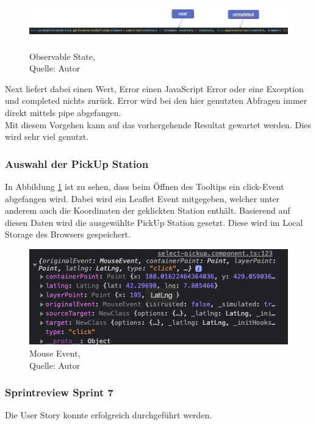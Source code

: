 \begin{figure}[H]
	\centering
	\includegraphics[width=1\textwidth]{images/observable.PNG}
	\caption[Observable States]{Observable State,\\ Quelle: Autor}
	\label{img: observableState}
\end{figure} 

Next liefert dabei einen Wert, Error einen JavaScript Error oder eine Exception und completed nichts zurück. 
Error wird bei den hier genutzten Abfragen immer direkt mittels pipe abgefangen. \\
Mit diesem Vorgehen kann auf das vorhergehende Resultat gewartet werden. Dies wird sehr viel genutzt. 

\subsubsection{Auswahl der PickUp Station}
In Abbildung \ref{img: observableState} ist zu sehen, dass beim Öffnen des Tooltips ein click-Event abgefangen wird. Dabei wird ein Leaflet Event mitgegeben, welcher unter anderem auch die Koordinaten der geklickten Station enthält. Basierend auf diesen Daten wird die ausgewählte PickUp Station gesetzt. Diese wird im Local Storage des Browsers gespeichert. 
 \begin{figure}[H]
	\centering
	\includegraphics[scale=0.5]{images/mouseEvent.PNG}
	\caption[Mouse Event]{Mouse Event,\\ Quelle: Autor}
	\label{img: MouseEvent}
\end{figure} 
\subsubsection{Sprintreview Sprint 7}
Die User Story konnte erfolgreich durchgeführt werden. 

